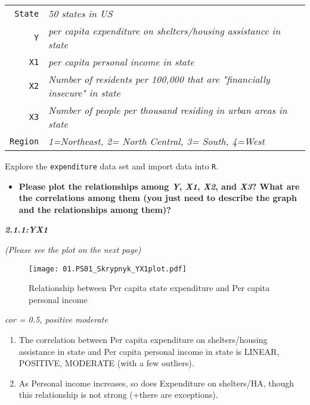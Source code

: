 \documentclass[12pt,letterpaper]{article}
\begin{document}
\begin{tabular}{r|l}
	\texttt{State} &\emph{50 states in US} \\
	\texttt{Y} & \emph{per capita expenditure on shelters/housing assistance in state}\\
	\texttt{X1} &\emph{per capita personal income in state} \\
	\texttt{X2} &  \emph{Number of residents per 100,000 that are "financially insecure" in state}\\
	\texttt{X3} &  \emph{Number of people per thousand residing in urban areas in state} \\
	\texttt{Region} &  \emph{1=Northeast, 2= North Central, 3= South, 4=West} \\
\end{tabular}

\vspace{.5cm}
\noindent Explore the \texttt{expenditure} data set and import data into \texttt{R}.
\vspace{.5cm}
  
\begin{itemize}

\item
\textbf {Please plot the relationships among \emph{Y}, \emph{X1}, \emph{X2}, and \emph{X3}? What are the correlations among them (you just need to describe the graph and the relationships among them)?}
\vspace{.2cm}
\end{itemize}

\noindent \begin{center}
	\textbf {\textit{2.1.1:YX1}}
\end{center}

\noindent \begin{center}
	\textit{(Please see the plot on the next page)}
\end{center}


\begin{figure}[H]
	\centering
	\caption{\footnotesize Relationship between Per capita state expenditure and Per capita personal income}
	\label{fig:plot_1}
	\texttt{[image: 01.PS01\_Skrypnyk\_YX1plot.pdf]}
\end{figure}

	\noindent 
	\centering
	\textit{cor = 0.5, positive moderate} 

\begin{enumerate}[$\circ$]
	\item The correlation between Per capita expenditure on shelters/housing assistance in state and Per capita personal income in state is LINEAR, POSITIVE, MODERATE (with a few outliers).
	\item As Personal income increases, so does Expenditure on shelters/HA, though this relationship is not strong (+there are exceptions).
	\vspace{5cm}
\end{enumerate}
\end{document}
